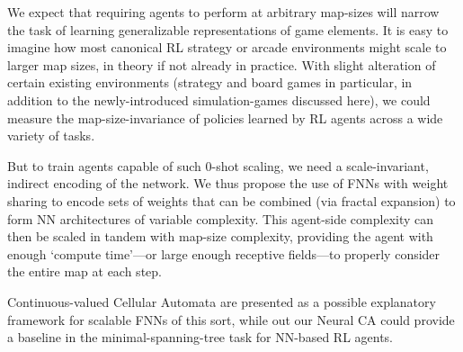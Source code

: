 \documentclass{article}
\begin{document}
We expect that requiring agents to perform at arbitrary map-sizes will narrow the task of learning generalizable representations of game elements.
It is easy to imagine how most canonical RL strategy or arcade environments might scale to larger map sizes, in theory if not already in practice. 
With slight alteration of certain existing environments (strategy and board games in particular, in addition to the newly-introduced simulation-games discussed here), we could measure the map-size-invariance of policies learned by RL agents across a wide variety of tasks.

But to train agents capable of such $0$-shot scaling, we need a scale-invariant, indirect encoding of the network.
We thus propose the use of FNNs with weight sharing to encode sets of weights that can be combined (via fractal expansion) to form NN architectures of variable complexity.
This agent-side complexity can then be scaled in tandem with map-size complexity, providing the agent with enough `compute time'---or large enough receptive fields---to properly consider the entire map at each step.

Continuous-valued Cellular Automata are presented as a possible explanatory framework for scalable FNNs of this sort, while out our Neural CA could provide a baseline in the minimal-spanning-tree task for NN-based RL agents. 

\end{document}
